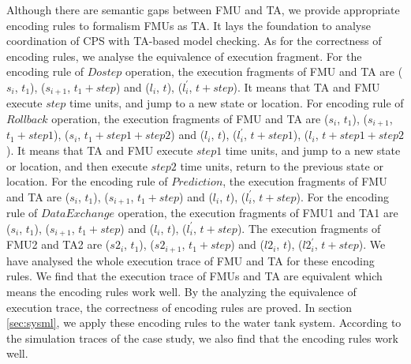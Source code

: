 Although there are semantic gaps between FMU and TA, we provide appropriate encoding rules to formalism FMUs as TA. It lays the foundation to analyse coordination of CPS with TA-based model checking. 
As for the correctness of encoding rules, we analyse the equivalence of execution fragment. For the encoding rule of $Dostep$ operation, the execution fragments of FMU and TA are ($s_{i}$, $t_{1}$), ($s_{i+1}$, $t_{1}+step$) and ($l_{i}$, $t$), ($l_{i}^{\prime}$, $t+step$). It means that TA and FMU execute $step$ time units, and jump to a new state or location. For encoding rule of $Rollback$ operation, the execution fragments of FMU and TA are ($s_{i}$, $t_{1}$), ($s_{i+1}$, $t_{1}+step1$), ($s_{i}$, $t_{1}+step1+step2$) and ($l_{i}$, $t$), ($l_{i}^{\prime}$, $t+step1$), ($l_{i}$, $t+step1+step2$). It means that TA and FMU execute $step1$ time units, and jump to a new state or location, and then execute $step2$ time units, return to the previous state or location. For the encoding rule of $Prediction$, the execution fragments of FMU and TA are ($s_{i}$, $t_{1}$), ($s_{i+1}$, $t_{1}+step$) and ($l_{i}$, $t$), ($l_{i}^{\prime}$, $t+step$). For the encoding rule of $Data Exchange$ operation, the execution fragments of FMU1 and TA1 are ($s_{i}$, $t_{1}$), ($s_{i+1}$, $t_{1}+step$) and ($l_{i}$, $t$), ($l_{i}^{\prime}$, $t+step$). The execution fragments of FMU2 and TA2 are ($s2_{i}$, $t_{1}$), ($s2_{i+1}$, $t_{1}+step$) and ($l2_{i}$, $t$), ($l2_{i}^{\prime}$, $t+step$). We have analysed the whole execution trace of FMU and TA for these encoding rules. We find that the execution trace of FMUs and TA are equivalent which means the encoding rules work well. By the analyzing the equivalence of execution trace, the correctness of encoding rules are proved. In section \ref{sec:sysml}, we apply these encoding rules to the water tank system. According to the simulation traces of the case study, we also find that the encoding rules work well.